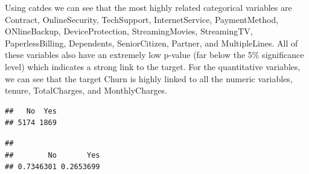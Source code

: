 \documentclass[
]{article}
\newenvironment{Shaded}{\begin{snugshade}}{\end{snugshade}}
\newcommand{\AttributeTok}[1]{\textcolor[rgb]{0.13,0.29,0.53}{#1}}
\newcommand{\CommentTok}[1]{\textcolor[rgb]{0.56,0.35,0.01}{\textit{#1}}}
\newcommand{\FunctionTok}[1]{\textcolor[rgb]{0.13,0.29,0.53}{\textbf{#1}}}
\newcommand{\NormalTok}[1]{#1}
\newcommand{\OtherTok}[1]{\textcolor[rgb]{0.56,0.35,0.01}{#1}}
\newcommand{\SpecialCharTok}[1]{\textcolor[rgb]{0.81,0.36,0.00}{\textbf{#1}}}
\newcommand{\StringTok}[1]{\textcolor[rgb]{0.31,0.60,0.02}{#1}}
\begin{document}
Using catdes we can see that the most highly related categorical
variables are Contract, OnlineSecurity, TechSupport, InternetService,
PaymentMethod, ONlineBackup, DeviceProtection, StreamingMovies,
StreamingTV, PaperlessBilling, Dependents, SeniorCitizen, Partner, and
MultipleLines. All of these variables also have an extremely low p-value
(far below the 5\% significance level) which indicates a strong link to
the target. For the quantitative variables, we can see that the target
Churn is highly linked to all the numeric variables, tenure,
TotalCharges, and MonthlyCharges.

\begin{Shaded}
\end{Shaded}

\begin{verbatim}
##   No  Yes 
## 5174 1869
\end{verbatim}

\begin{Shaded}
\end{Shaded}

\begin{verbatim}
## 
##        No       Yes 
## 0.7346301 0.2653699
\end{verbatim}

\begin{Shaded}
\end{Shaded}
\end{document}
